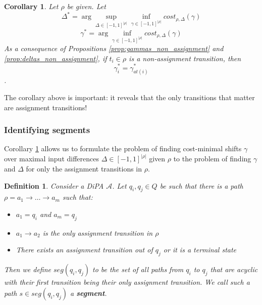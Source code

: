 \documentclass{article}
\newtheorem{corollary}{Corollary}[theorem]
\newtheorem{definition}{Definition}[section]
\newcommand{\1}{\langle 1 \rangle}
\newcommand{\2}{\langle 2 \rangle}
\begin{document}
\begin{corollary}
    \label{cor:non_assignment_solved}
    Let $\rho$ be given. Let \[\Delta^* = \arg \sup_{\Delta \in [-1, 1]^{|\rho|}} \inf_{\gamma \in [-1, 1]^{|\rho|}} cost_{\rho, \Delta} (\gamma)\]
    \[\gamma^* = \arg \inf_{\gamma \in [-1, 1]^{|\rho|}} cost_{\rho, \Delta}(\gamma)\]
    As a consequence of Propositions \ref{prop:gammas_non_assignment} and \ref{prop:deltas_non_assignment}, if $t_i \in \rho$ is a non-assignment transition, then \[\gamma_i^* = 
    \gamma^*_{at(i)}\].

\end{corollary}

The corollary above is important: it reveals that the only transitions that matter are assignment transitions!

\subsubsection{Identifying segments}

Corollary \ref{cor:non_assignment_solved} allows us to formulate the problem of finding cost-minimal shifts $\gamma$ over maximal input differences $\Delta \in [-1, 1]^{|\rho|}$ given $\rho$ to the problem of finding $\gamma$ and $\Delta$ for only the assignment transitions in $\rho$. 

\begin{definition}
    Consider a DiPA $\mathcal{A}$. Let $q_i, q_j \in Q$ be such that there is a path $\rho = a_1 \to \dots \to a_m$ such that:

    \begin{itemize}
        \item $a_1 = q_i$ and $a_m = q_j$
        \item $a_1 \to a_2$ is the only assignment transition in $\rho$
        \item There exists an assignment transition out of $q_j$ or it is a terminal state
    \end{itemize}

    Then we define $seg(q_i, q_j)$ to be the set of all paths from $q_i$ to $q_j$ that are acyclic with their first transition being their only assignment transition. We call such a path $s \in seg(q_i, q_j)$ a \textbf{segment}. 
\end{definition}
\end{document}
